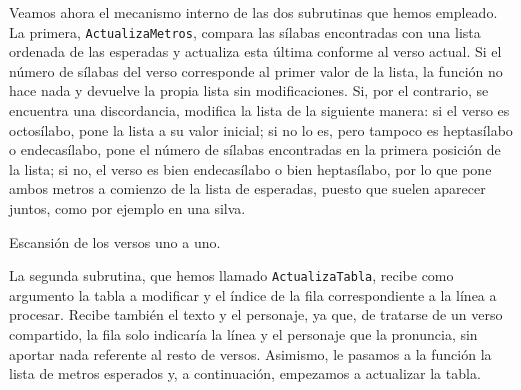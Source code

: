 Veamos ahora el mecanismo interno de las dos subrutinas que hemos empleado. La primera, \texttt{ActualizaMetros}, compara las sílabas encontradas con una lista ordenada de las esperadas y actualiza esta última conforme al verso actual. Si el número de sílabas del verso corresponde al primer valor de la lista, la función no hace nada y devuelve la propia lista sin modificaciones. Si, por el contrario, se encuentra una discordancia, modifica la lista de la siguiente manera: si el verso es octosílabo, pone la lista a su valor inicial; si no lo es, pero tampoco es heptasílabo o endecasílabo, pone el número de sílabas encontradas en la primera posición de la lista; si no, el verso es bien endecasílabo o bien heptasílabo, por lo que pone ambos metros a comienzo de la lista de esperadas, puesto que suelen aparecer juntos, como por ejemplo en una silva.

\begin{algorithm}[!h]
	\caption{Escansión de los versos uno a uno.}\label{list:actualizametros}
\end{algorithm}

La segunda subrutina, que hemos llamado \texttt{ActualizaTabla}, recibe como argumento la tabla a modificar y el índice de la fila correspondiente a la línea a procesar. Recibe también el texto y el personaje, ya que, de tratarse de un verso compartido, la fila solo indicaría la línea y el personaje que la pronuncia, sin aportar nada referente al resto de versos. Asimismo, le pasamos a la función la lista de metros esperados y, a continuación, empezamos a actualizar la tabla.

